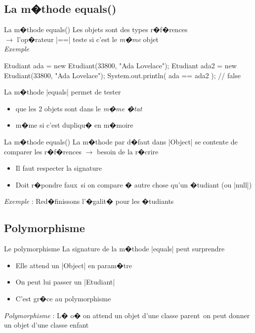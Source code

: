 \subsection{La m�thode equals()}

\begin{frame}[fragile]{La m�thode equals()}
Les objets sont des types r�f�rences
\\$\longrightarrow$ l'op�rateur \java|==| teste si c'est le \emph{m�me} objet
\\\bigskip
\emph{Exemple}
\begin{Java}
  Etudiant ada = new Etudiant(33800, "Ada Lovelace");
  Etudiant ada2 = new Etudiant(33800, "Ada Lovelace");
  System.out.println( ada == ada2 );  // false
\end{Java}
\bigskip
La m�thode \java|equals| permet de tester
\begin{itemize}
\item que les 2 objets sont dans le \emph{m�me �tat}  
\item m�me si c'est dupliqu� en m�moire
\end{itemize}
\end{frame}

\begin{frame}{La m�thode equals()}
La m�thode par d�faut dans \java|Object| se contente de comparer les r�f�rences
$\longrightarrow$ besoin de la r�crire
\begin{itemize}
\item Il faut respecter la signature
\item Doit r�pondre \og faux\fg\ si on compare � autre chose qu'un �tudiant (ou \java|null|)
\end{itemize}
\medskip
\emph{Exemple} : Red�finissons l'�galit� pour les �tudiants
\end{frame}

\subsection{Polymorphisme}

\begin{frame}[fragile]{Le polymorphisme}
La signature de la m�thode \java|equals| peut surprendre 
\begin{Java}
  public boolean equals(Object o) { // ...
\end{Java}
\begin{itemize}
\item Elle attend un \java|Object| en param�tre
\item On peut lui passer un \java|Etudiant|
\item C'est gr�ce au polymorphisme
\end{itemize}
\medskip
\emph{Polymorphisme} : L� o� on attend un objet d'une classe \og parent\fg\ on peut donner un objet
d'une classe \og enfant\fg\
\end{frame}

